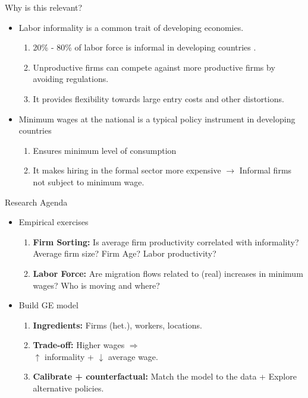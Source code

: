 \documentclass[usenames,dvipsnames,aspectratio=169]{beamer}
\begin{document}
\begin{frame}{Why is this relevant?}\label{hm1:relevance}
\begin{itemize}
    \item Labor informality is a common trait of developing economies. 
        \begin{enumerate}
            \item 20\% - 80\% of labor force is informal in developing countries \citet{Ulyssea20}. 
            \item Unproductive firms can compete against more productive firms by avoiding regulations. 
            \item It provides flexibility towards large entry costs and other distortions. 
        \end{enumerate}
        \bigskip 
        \item Minimum wages at the national is a typical policy instrument in developing countries
        \begin{enumerate}
            \item Ensures minimum level of consumption 
            \item It makes hiring in the formal sector more expensive $\rightarrow$ Informal firms not subject to minimum wage.
        \end{enumerate}
\end{itemize}      
\end{frame}
\begin{frame}{Research Agenda}
\begin{itemize}
    \item Empirical exercises
    \begin{enumerate}
        \item \textbf{Firm Sorting:} Is average firm productivity correlated with informality? Average firm size? Firm Age? Labor productivity?
        \item \textbf{Labor Force:} Are migration flows related to (real) increases in minimum wages? Who is moving and where?  
    \end{enumerate}
    \bigskip 
    \item Build GE model
    \begin{enumerate}
        \item \textbf{Ingredients:} Firms (het.), workers, locations. 
        \item \textbf{Trade-off:} Higher wages $\Rightarrow$ \\
         $\uparrow$ informality + $\downarrow$ average wage. 
        \item \textbf{Calibrate + counterfactual:} Match the model to the data + Explore alternative policies. 
    \end{enumerate}
\end{itemize}
\end{frame}
\end{document}
